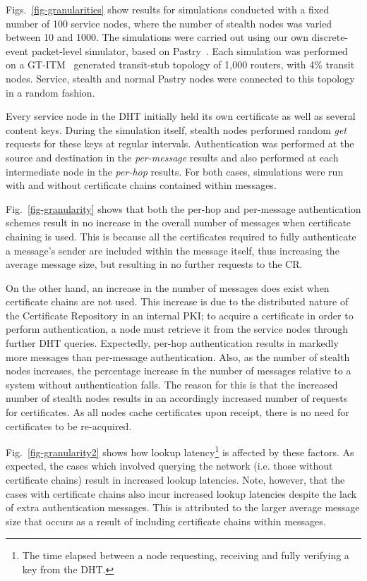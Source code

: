\documentclass[pdftex,conference,10pt]{IEEEtran}
\begin{document}
Figs.~\ref{fig-granularities} show results for simulations conducted
with a fixed number of 100 service nodes, where the number of stealth
nodes was varied between 10 and 1000. The simulations were carried out
using our own discrete-event packet-level simulator, based on
Pastry~\cite{Rowstron01Pastry}. Each simulation was performed on a
GT-ITM~\cite{Calvert97Modeling} generated transit-stub topology of
1,000 routers, with 4\% transit nodes. Service, stealth and normal
Pastry nodes were connected to this topology in a random fashion.

Every service node in the DHT initially held its own certificate as
well as several content keys. During the simulation itself, stealth
nodes performed random \emph{get} requests for these keys at regular
intervals. Authentication was performed at the source and destination
in the \emph{per-message} results and also performed at each
intermediate node in the \emph{per-hop} results. For both cases,
simulations were run with and without certificate chains contained
within messages.

Fig.~\ref{fig-granularity} shows that both the per-hop and per-message
authentication schemes result in no increase in the overall number of
messages when certificate chaining is used. This is because all the
certificates required to fully authenticate a message's sender are
included within the message itself, thus increasing the average message
size, but resulting in no further requests to the CR.

On the other hand, an increase in the number of messages does exist
when certificate chains are not used. This increase is due to the
distributed nature of the Certificate Repository in an internal PKI; to
acquire a certificate in order to perform authentication, a node must
retrieve it from the service nodes through further DHT queries.
Expectedly, per-hop authentication results in markedly more messages
than per-message authentication. Also, as the number of stealth nodes
increases, the percentage increase in the number of messages relative
to a system without authentication falls. The reason for this is that
the increased number of stealth nodes results in an accordingly
increased number of requests for certificates. As all nodes cache
certificates upon receipt, there is no need for certificates to be
re-acquired.

Fig.~\ref{fig-granularity2} shows how lookup latency\footnote{The time
elapsed between a node requesting, receiving and fully verifying a key
from the DHT.} is affected by these factors. As expected, the cases
which involved querying the network (i.e. those without certificate
chains) result in increased lookup latencies. Note, however, that the
cases with certificate chains also incur increased lookup latencies
despite the lack of extra authentication messages. This is attributed
to the larger average message size that occurs as a result of including
certificate chains within messages.
\end{document}
